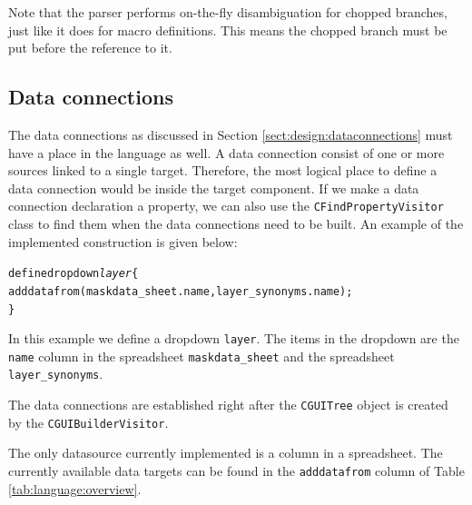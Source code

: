 Note that the parser performs on-the-fly disambiguation for chopped branches,
just like it does for macro definitions. This means the chopped branch must be
put before the reference to it.

\subsection{Data connections}
The data connections as discussed in Section \ref{sect:design:dataconnections}
must have a place in the language as well. A data connection consist of one or
more sources linked to a single target. Therefore, the most logical place to
define a data connection would be inside the target component. If we make a
data connection declaration a property, we can also use the
\verb=CFindPropertyVisitor= class to find them when the data connections need
to be built. An example of the implemented construction is given below:
\begin{alltt}
define dropdown \emph{layer} \{
    adddatafrom(maskdata_sheet.name, layer_synonyms.name);
\}
\end{alltt}
In this example we define a dropdown \verb=layer=. The items in the dropdown
are the \verb=name= column in the spreadsheet \verb=maskdata_sheet= and the
spreadsheet \verb=layer_synonyms=.

The data connections are established right after the \verb=CGUITree= object is
created by the \verb=CGUIBuilderVisitor=.

\bigskip \noindent
The only datasource currently implemented is a column in a spreadsheet. The
currently available data targets can be found in the \verb=adddatafrom= column
of Table \ref{tab:language:overview}.

